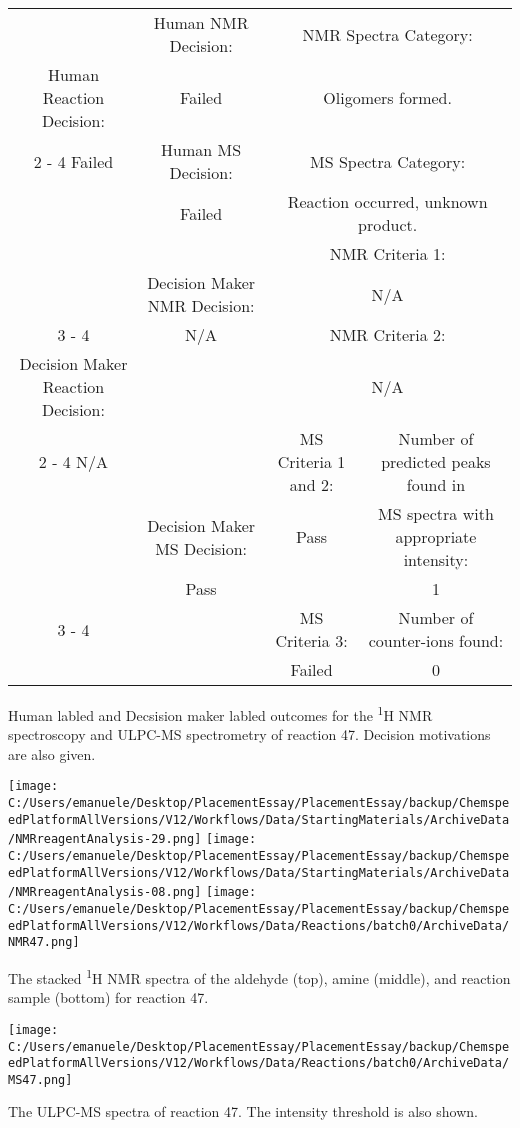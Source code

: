 \documentclass{article}%
\begin{document}
\begin{Decision Table}[H]%
\begin{tabular}{|c|c|c|c|}%
\hline%
&Human NMR Decision:&\multicolumn{2}{|c|}{NMR Spectra Category:}\\%
Human Reaction Decision:&Failed&\multicolumn{2}{|c|}{Oligomers formed.}\\%
\cline{2%
-%
4}%
Failed&Human MS Decision:&\multicolumn{2}{|c|}{MS Spectra Category:}\\%
&Failed&\multicolumn{2}{|c|}{Reaction occurred, unknown product.}\\%
\hline%
&&\multicolumn{2}{|c|}{NMR Criteria 1:}\\%
&Decision Maker NMR Decision:&\multicolumn{2}{|c|}{N/A}\\%
\cline{3%
-%
4}%
&N/A&\multicolumn{2}{|c|}{NMR Criteria 2:}\\%
Decision Maker Reaction Decision:&&\multicolumn{2}{|c|}{N/A}\\%
\cline{2%
-%
4}%
N/A&&MS Criteria 1 and 2:&Number of predicted peaks found in\\%
&Decision Maker MS Decision:&Pass&MS spectra with appropriate intensity:\\%
&Pass&&1\\%
\cline{3%
-%
4}%
&&MS Criteria 3:&Number of counter{-}ions found:\\%
&&Failed&0\\%
\hline%
\end{tabular}%
\caption{Human labled and Decsision maker labled outcomes for the \textsuperscript{1}H NMR spectroscopy and ULPC-MS spectrometry of reaction 47. Decision motivations are also given.}%
\end{Decision Table}%
\begin{NMR Spectra}[H]%
\begin{center}%
\texttt{[image: C:/Users/emanuele/Desktop/PlacementEssay/PlacementEssay/backup/ChemspeedPlatformAllVersions/V12/Workflows/Data/StartingMaterials/ArchiveData/NMRreagentAnalysis-29.png]}\hfill%
\texttt{[image: C:/Users/emanuele/Desktop/PlacementEssay/PlacementEssay/backup/ChemspeedPlatformAllVersions/V12/Workflows/Data/StartingMaterials/ArchiveData/NMRreagentAnalysis-08.png]}\hfill%
\texttt{[image: C:/Users/emanuele/Desktop/PlacementEssay/PlacementEssay/backup/ChemspeedPlatformAllVersions/V12/Workflows/Data/Reactions/batch0/ArchiveData/NMR47.png]}\hfill%
\end{center}%
\caption{The stacked \textsuperscript{1}H NMR spectra of the aldehyde (top), amine (middle), and reaction sample (bottom) for reaction 47.}%
\end{NMR Spectra}%
\begin{MS Spectra}[H]%
\begin{center}%
\texttt{[image: C:/Users/emanuele/Desktop/PlacementEssay/PlacementEssay/backup/ChemspeedPlatformAllVersions/V12/Workflows/Data/Reactions/batch0/ArchiveData/MS47.png]}\hfill%
\end{center}%
\caption{The ULPC-MS spectra of reaction 47. The intensity threshold is also shown.}%
\end{MS Spectra}%
\end{document}

